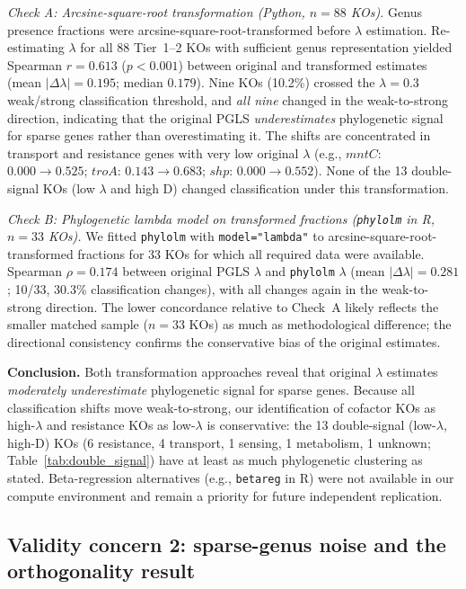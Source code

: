 \documentclass[11pt]{article}
\begin{document}
\textit{Check A: Arcsine-square-root transformation (Python, $n = 88$ KOs).}
Genus presence fractions were arcsine-square-root-transformed before $\lambda$ estimation.
Re-estimating $\lambda$ for all 88 Tier~1--2 KOs with sufficient genus representation yielded Spearman $r = 0.613$ ($p < 0.001$) between original and transformed estimates (mean $|\Delta\lambda| = 0.195$; median $0.179$).
Nine KOs (10.2\%) crossed the $\lambda = 0.3$ weak/strong classification threshold, and \emph{all nine} changed in the weak-to-strong direction, indicating that the original PGLS \emph{underestimates} phylogenetic signal for sparse genes rather than overestimating it.
The shifts are concentrated in transport and resistance genes with very low original $\lambda$ (e.g., $mntC$: $0.000 \to 0.525$; $troA$: $0.143 \to 0.683$; $shp$: $0.000 \to 0.552$).
None of the 13 double-signal KOs (low $\lambda$ and high D) changed classification under this transformation.

\textit{Check B: Phylogenetic lambda model on transformed fractions (\texttt{phylolm} in R, $n = 33$ KOs).}
We fitted \texttt{phylolm} with \texttt{model="lambda"} to arcsine-square-root-transformed fractions for 33 KOs for which all required data were available.
Spearman $\rho = 0.174$ between original PGLS $\lambda$ and \texttt{phylolm} $\lambda$ (mean $|\Delta\lambda| = 0.281$; 10/33, 30.3\% classification changes), with all changes again in the weak-to-strong direction.
The lower concordance relative to Check~A likely reflects the smaller matched sample ($n = 33$ KOs) as much as methodological difference; the directional consistency confirms the conservative bias of the original estimates.

\textbf{Conclusion.}
Both transformation approaches reveal that original $\lambda$ estimates \emph{moderately underestimate} phylogenetic signal for sparse genes.
Because all classification shifts move weak-to-strong, our identification of cofactor KOs as high-$\lambda$ and resistance KOs as low-$\lambda$ is conservative: the 13 double-signal (low-$\lambda$, high-D) KOs (6 resistance, 4 transport, 1 sensing, 1 metabolism, 1 unknown; Table~\ref{tab:double_signal}) have at least as much phylogenetic clustering as stated.
Beta-regression alternatives (e.g., \texttt{betareg} in R) were not available in our compute environment and remain a priority for future independent replication.

\subsection{Validity concern 2: sparse-genus noise and the orthogonality result}
\end{document}
